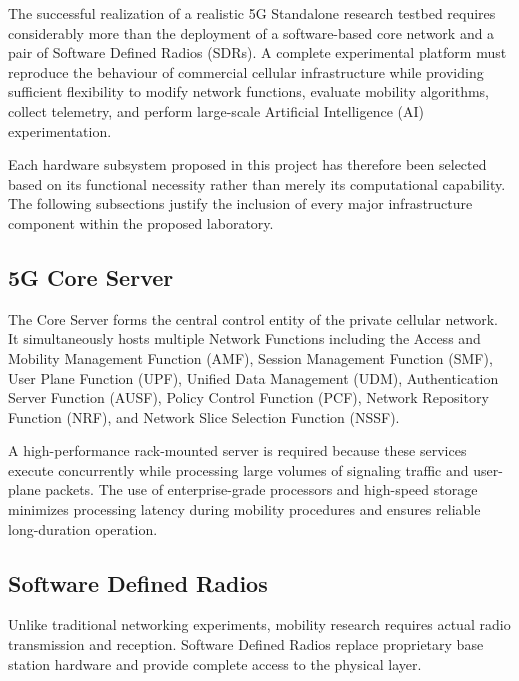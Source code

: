 \documentclass[12pt,a4paper]{article}\usepackage[a4paper,margin=1in]{geometry}\usepackage{graphicx}\usepackage{longtable}\usepackage{booktabs}\usepackage{hyperref}\usepackage{enumitem}\usepackage{amsmath}\usepackage{tikz}\usepackage{pgfgantt}\usepackage{setspace}\setstretch{1.15}\usetikzlibrary{positioning,arrows.meta,shapes.geometric}
\begin{document}
	The successful realization of a realistic 5G Standalone research testbed requires considerably more than the deployment of a software-based core network and a pair of Software Defined Radios (SDRs). A complete experimental platform must reproduce the behaviour of commercial cellular infrastructure while providing sufficient flexibility to modify network functions, evaluate mobility algorithms, collect telemetry, and perform large-scale Artificial Intelligence (AI) experimentation.
	
	Each hardware subsystem proposed in this project has therefore been selected based on its functional necessity rather than merely its computational capability. The following subsections justify the inclusion of every major infrastructure component within the proposed laboratory.
	
	
	\subsection{5G Core Server}
	
	The Core Server forms the central control entity of the private cellular network. It simultaneously hosts multiple Network Functions including the Access and Mobility Management Function (AMF), Session Management Function (SMF), User Plane Function (UPF), Unified Data Management (UDM), Authentication Server Function (AUSF), Policy Control Function (PCF), Network Repository Function (NRF), and Network Slice Selection Function (NSSF).
	
	A high-performance rack-mounted server is required because these services execute concurrently while processing large volumes of signaling traffic and user-plane packets. The use of enterprise-grade processors and high-speed storage minimizes processing latency during mobility procedures and ensures reliable long-duration operation.
	
	
	\subsection{Software Defined Radios}
	
	Unlike traditional networking experiments, mobility research requires actual radio transmission and reception. Software Defined Radios replace proprietary base station hardware and provide complete access to the physical layer.
	
\end{document}
